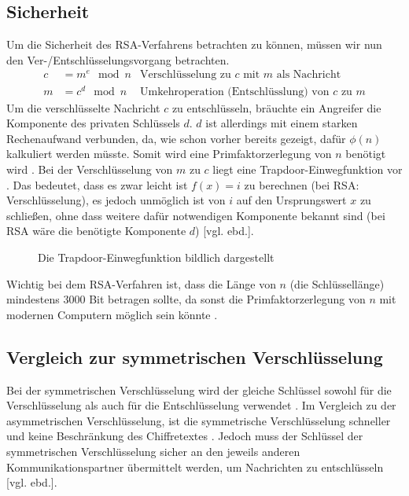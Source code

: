 \documentclass[a4paper,ngerman, headheight=28pt,12pt]{scrartcl}
\newcommand{\vcite}[1]{\cite[vgl.][]{#1}}
\newcommand{\vebd}{[vgl. ebd.]}
\begin{document}
\subsection{Sicherheit}
Um die Sicherheit des RSA-Verfahrens betrachten zu können, müssen wir nun den Ver-/Entschlüsselungsvorgang betrachten.
\begin{equation*}
  \begin{aligned}
    c & = m^e \mod n & \text{Verschlüsselung zu $c$ mit $m$ als Nachricht}    \\
    m & = c^d \mod n & \text{Umkehroperation (Entschlüsslung) von $c$ zu $m$}
  \end{aligned}
\end{equation*}
Um die verschlüsselte Nachricht $c$ zu entschlüsseln, bräuchte ein Angreifer die Komponente des privaten Schlüssels $d$. $d$ ist allerdings mit einem starken Rechenaufwand verbunden, da, wie schon vorher bereits gezeigt, dafür $\phi(n)$ kalkuliert werden müsste. Somit wird eine Primfaktorzerlegung von $n$ benötigt wird \vcite{EulersTotientFunction}. Bei der Verschlüsselung von $m$ zu $c$ liegt eine Trapdoor-Einwegfunktion vor \vcite{RsaTrapdoor}. Das bedeutet, dass es zwar leicht ist $f(x) = i$ zu berechnen (bei RSA: Verschlüsselung), es jedoch unmöglich ist von $i$ auf den Ursprungswert $x$ zu schließen, ohne dass weitere dafür notwendigen Komponente bekannt sind (bei RSA wäre die benötigte Komponente $d$) \vebd.
\begin{figure}[h]
  \centering
  
  \caption{Die Trapdoor-Einwegfunktion bildlich dargestellt\vcite{fig:TrapdoorPermutation} \label{fig:TrapdoorFunc}}
\end{figure}

Wichtig bei dem RSA-Verfahren ist, dass die Länge von $n$ (die Schlüssellänge) mindestens 3000 Bit betragen sollte, da sonst die Primfaktorzerlegung von $n$ mit modernen Computern möglich sein könnte \vcite{RsaKeyLength}.

\subsection{Vergleich zur symmetrischen Verschlüsselung}
Bei der symmetrischen Verschlüsselung wird der gleiche Schlüssel sowohl für die Verschlüsselung als auch für die Entschlüsselung verwendet \vcite{GeneralSymmetricCryptography}.
Im Vergleich zu der asymmetrischen Verschlüsselung, ist die symmetrische Verschlüsselung schneller und keine Beschränkung des Chiffretextes \vcite{RsaAESAnalysis, OpensslRsaMaxLength}. Jedoch muss der Schlüssel der symmetrischen Verschlüsselung sicher an den jeweils anderen Kommunikationspartner übermittelt werden, um Nachrichten zu entschlüsseln \vebd.
\end{document}
